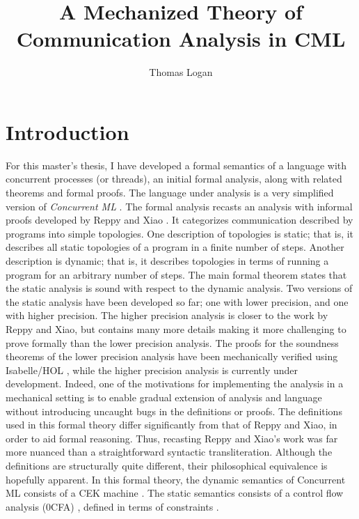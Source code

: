 \documentclass[letterpaper, 11pt]{extarticle}
\title{A Mechanized Theory of Communication Analysis in CML}
\author{Thomas Logan}
\begin{document}
\maketitle
{}

\newpage
{}

\section{Introduction}
For this master's thesis, I have developed a formal semantics of
a language with concurrent processes (or threads), an initial formal analysis, along with related theorems and formal 
proofs. The language under analysis is
a very simplified version of \textit{Concurrent ML} \cite{reppy2007concurrent}. The formal analysis
recasts an analysis with informal proofs developed by Reppy and Xiao \cite{reppy2007specialization}. It
categorizes communication described by programs into simple topologies. One description of
topologies is static; that is, it describes all static topologies of a program in a finite number of steps.
Another description is dynamic; that is, it describes topologies in terms of running
a program for an arbitrary number of steps. The main formal theorem states that the static
analysis is sound with respect to the dynamic analysis. Two versions of the static analysis
have been developed so far; one with lower precision, and one with higher precision. The higher
precision analysis is closer to the work by Reppy and Xiao, but contains many more details making
it more challenging to prove formally than the lower precision analysis.
The proofs for the soundness theorems of the lower precision analysis
have been mechanically verified using Isabelle/HOL \cite{nipkow2002isabelle}, while the higher precision
analysis is currently under development. Indeed, one of the motivations for implementing the analysis 
in a mechanical setting is to enable gradual extension of analysis and language without introducing
uncaught bugs in the definitions or proofs. The definitions used in this formal theory differ
significantly from that of Reppy and Xiao, in order to aid formal reasoning. Thus, recasting
Reppy and Xiao's work was far more nuanced than a straightforward
syntactic transliteration.
Although the definitions are structurally quite different,
their philosophical equivalence is hopefully apparent. 
In this formal theory, the dynamic semantics of Concurrent ML consists of 
a CEK machine \cite{felleisen1986control}. The static semantics consists of a control flow analysis (0CFA)
\cite{shivers1991control}, defined in terms of constraints \cite{nielson2015principles}.
\end{document}
